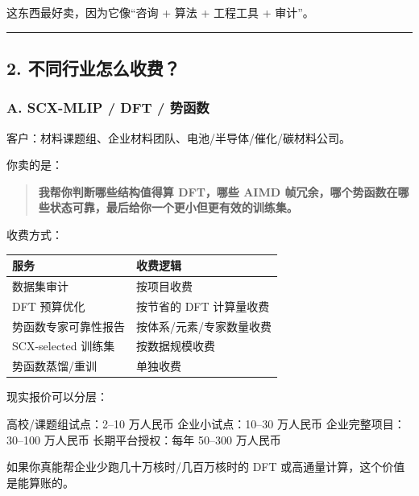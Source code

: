 \documentclass[
  12pt,
]{ctexart}
\newenvironment{Shaded}{}{}
\newcommand{\NormalTok}[1]{#1}
\begin{document}
这东西最好卖，因为它像``咨询 + 算法 + 工程工具 + 审计''。

\begin{center}\rule{0.5\linewidth}{0.5pt}\end{center}

\subsection{2.
不同行业怎么收费？}\label{ux4e0dux540cux884cux4e1aux600eux4e48ux6536ux8d39}

\subsubsection{A. SCX-MLIP / DFT /
势函数}\label{a.-scx-mlip-dft-ux52bfux51fdux6570}

客户：材料课题组、企业材料团队、电池/半导体/催化/碳材料公司。

你卖的是：

\begin{quote}
\textbf{我帮你判断哪些结构值得算 DFT，哪些 AIMD
帧冗余，哪个势函数在哪些状态可靠，最后给你一个更小但更有效的训练集。}
\end{quote}

收费方式：

\begin{longtable}[]{@{}ll@{}}
\toprule\noalign{}
服务 & 收费逻辑 \\
\midrule\noalign{}
\endhead
\bottomrule\noalign{}
\endlastfoot
数据集审计 & 按项目收费 \\
DFT 预算优化 & 按节省的 DFT 计算量收费 \\
势函数专家可靠性报告 & 按体系/元素/专家数量收费 \\
SCX-selected 训练集 & 按数据规模收费 \\
势函数蒸馏/重训 & 单独收费 \\
\end{longtable}

现实报价可以分层：

\begin{Shaded}
\begin{Highlighting}[]
\NormalTok{高校/课题组试点：2–10 万人民币}
\NormalTok{企业小试点：10–30 万人民币}
\NormalTok{企业完整项目：30–100 万人民币}
\NormalTok{长期平台授权：每年 50–300 万人民币}
\end{Highlighting}
\end{Shaded}

如果你真能帮企业少跑几十万核时/几百万核时的 DFT
或高通量计算，这个价值是能算账的。
\end{document}
